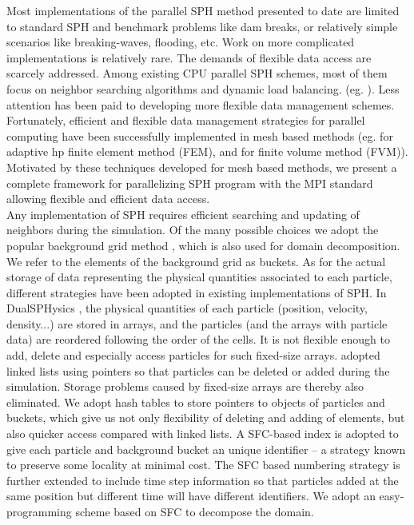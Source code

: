 Most implementations of the parallel SPH method presented to date are limited to standard SPH and benchmark problems like dam breaks, or relatively simple scenarios like breaking-waves, flooding, etc. Work on more complicated implementations is relatively rare. The demands of flexible data access are scarcely addressed. Among existing CPU parallel SPH schemes, most of them focus on neighbor searching algorithms and dynamic load balancing. (eg. \citep{ferrari2009new, crespo2015dualsphysics}). Less attention has been paid to developing more flexible data management schemes. 
Fortunately, efficient and flexible data management strategies for parallel computing have been successfully implemented in mesh based methods (eg. \citep{laszloffy2000simple} for adaptive hp finite element method (FEM), and \citep{patra2005parallel} for finite volume method (FVM)). Motivated by these techniques developed for mesh based methods, we present a complete framework for parallelizing SPH program with the MPI standard allowing flexible and efficient data access.\\
Any implementation of SPH requires efficient searching and updating of neighbors during the simulation. Of the many possible choices we adopt the popular background grid method \citep{monaghan1985refined}, which is also used for domain decomposition. We refer to the elements of the background grid as buckets. 
As for the actual storage of data representing the physical quantities associated to each particle, different strategies have been adopted in existing implementations of SPH. 
In DualSPHysics \citep{crespo2015dualsphysics}, the physical quantities of each particle (position, velocity, density...) are stored in arrays, and the particles (and the arrays with particle data) are reordered following the order of the cells. It is not flexible enough to add, delete and especially access particles for such fixed-size arrays. \citet{ferrari2009new} adopted linked lists using pointers so that particles can be deleted or added during the simulation. Storage problems caused by fixed-size arrays are thereby also eliminated. We adopt hash tables to store pointers to objects of particles and buckets, which give us not only flexibility of deleting and adding of elements, but also quicker access compared with linked lists. A SFC-based index is adopted to give each particle and background bucket an unique identifier -- a strategy known to preserve some locality at minimal cost. The SFC based numbering strategy is further extended to include time step information so that particles added at the same position but different time will have different identifiers. 
We adopt an easy-programming scheme based on SFC \citep{patra1999efficient} to decompose the domain.

